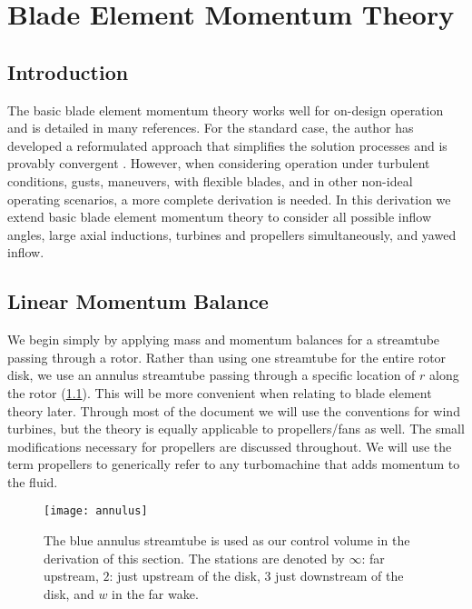 



\chapter{Blade Element Momentum Theory}

\section{Introduction}

The basic blade element momentum theory works well for on-design operation and is detailed in many references.  For the standard case, the author has developed a reformulated approach that simplifies the solution processes and is provably convergent \cite{Ning2014-Simple-Solution}.  However, when considering operation under turbulent conditions, gusts, maneuvers, with flexible blades, and in other non-ideal operating scenarios, a more complete derivation is needed.  In this derivation we extend basic blade element momentum theory to consider all possible inflow angles, large axial inductions, turbines and propellers simultaneously, and yawed inflow.

\section{Linear Momentum Balance}

We begin simply by applying mass and momentum balances for a streamtube passing through a rotor.  Rather than using one streamtube for the entire rotor disk, we use an annulus streamtube passing through a specific location of $r$ along the rotor (\cref{fig:annulus}). This will be more convenient when relating to blade element theory later.  Through most of the document we will use the conventions for wind turbines, but the theory is equally applicable to propellers/fans as well.  The small modifications necessary for propellers are discussed throughout.  We will use the term propellers to generically refer to any turbomachine that adds momentum to the fluid.

\begin{figure}[htbp]
\centering
\texttt{[image: annulus]}
\caption{The blue annulus streamtube is used as our control volume in the derivation of this section.  The stations are denoted by $\infty$: far upstream, $2$: just upstream of the disk, $3$ just downstream of the disk, and $w$ in the far wake.}
\label{fig:annulus}
\end{figure}

